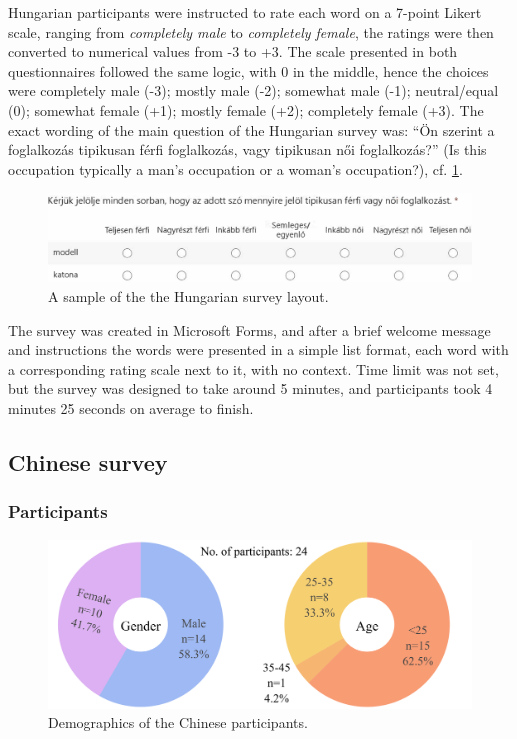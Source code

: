 \documentclass[11pt]{article}
\begin{document}
Hungarian participants were instructed to rate each word on a 7-point Likert scale, ranging from \textit{completely male} to \textit{completely female}, the ratings were then converted to numerical values from -3 to +3. The scale presented in both questionnaires followed the same logic, with 0 in the middle, hence the choices were completely male (-3); mostly male (-2); somewhat male (-1); neutral/equal (0); somewhat female (+1); mostly female (+2); completely female (+3). The exact wording of the main question of the Hungarian survey was: ``Ön szerint a foglalkozás tipikusan férfi foglalkozás, vagy tipikusan női foglalkozás?'' (Is this occupation typically a man's occupation or a woman's occupation?), cf. \ref{fig:survey_hu}.

\begin{figure}[!ht]
  \centering
  \includegraphics[width=\linewidth]{../survey_hu}
  \caption{A sample of the the Hungarian survey layout.}
  \label{fig:survey_hu}
\end{figure}

The survey was created in Microsoft Forms, and after a brief welcome message and instructions the words were presented in a simple list format, each word with a corresponding rating scale next to it, with no context. Time limit was not set, but the survey was designed to take around 5 minutes, and participants took 4 minutes 25 seconds on average to finish. 

\subsection{Chinese survey}

\subsubsection{Participants}

\begin{figure}[!ht]
  \centering
  \includegraphics[width=\linewidth]{../demographics_zh}
  \caption{Demographics of the Chinese participants.}
  \label{fig:demographics_zh}
\end{figure}
\end{document}

